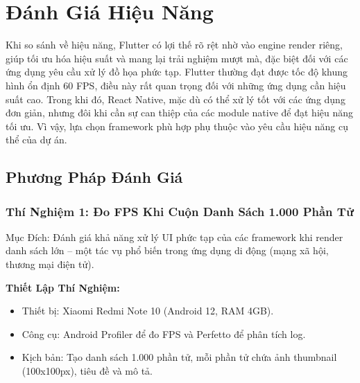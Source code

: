 \section{Đánh Giá Hiệu Năng}
\begin{flushleft}
  \hspace*{0.8cm}Khi so sánh về hiệu năng, Flutter có lợi thế rõ rệt nhờ vào engine render riêng, giúp tối ưu hóa hiệu suất và mang lại trải nghiệm mượt mà, đặc biệt đối với các ứng dụng yêu cầu xử lý đồ họa phức tạp. Flutter thường đạt được tốc độ khung hình ổn định 60 FPS, điều này rất quan trọng đối với những ứng dụng cần hiệu suất cao. Trong khi đó, React Native, mặc dù có thể xử lý tốt với các ứng dụng đơn giản, nhưng đôi khi cần sự can thiệp của các module native để đạt hiệu năng tối ưu. Vì vậy, lựa chọn framework phù hợp phụ thuộc vào yêu cầu hiệu năng cụ thể của dự án.
\end{flushleft}

\subsection{Phương Pháp Đánh Giá}
\renewcommand{\labelitemi}{--}    
\subsubsection{Thí Nghiệm 1: Đo FPS Khi Cuộn Danh Sách 1.000 Phần Tử}
\begin{flushleft}
  \hspace*{0.8cm}Mục Đích: Đánh giá khả năng xử lý UI phức tạp của các framework khi render danh sách lớn – một tác vụ phổ biến trong ứng dụng di động (mạng xã hội, thương mại điện tử).
\end{flushleft}

\begin{flushleft}
  \hspace*{0.8cm}\textbf{Thiết Lập Thí Nghiệm:}
  \setlength{\leftmargini}{1.5cm}
  \begin{itemize}
      \item Thiết bị: Xiaomi Redmi Note 10 (Android 12, RAM 4GB).
      \item Công cụ: Android Profiler để đo FPS và Perfetto để phân tích log.
      \item Kịch bản: Tạo danh sách 1.000 phần tử, mỗi phần tử chứa ảnh thumbnail (100x100px), tiêu đề và mô tả.
  \end{itemize}
\end{flushleft}

\vspace{0.5em}

